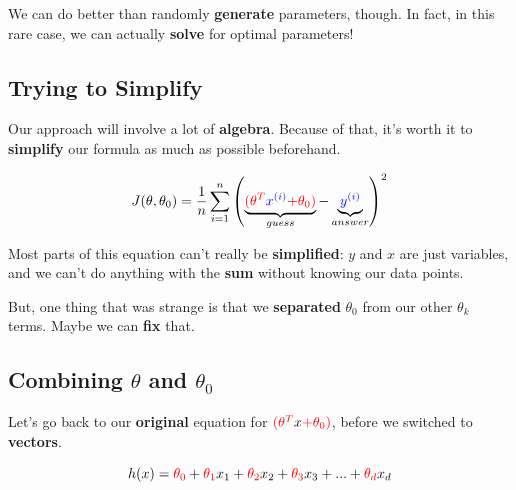     We can do better than randomly \textbf{generate} parameters, though. In fact, in this rare case, we can actually \textbf{solve} for optimal parameters!
    
    \subsection{Trying to Simplify}
        
        Our approach will involve a lot of \textbf{algebra}. Because of that, it's worth it to \textbf{simplify} our formula as much as possible beforehand.
        
        \begin{equation}
            J(\theta,\theta_0) = 
                        \frac{1}{n}  \sum_{i=1}^n 
                        \left( 
                            \underbrace{
                                \textcolor{red}{ (\theta^T} \textcolor{blue}{x^{(i)}} \textcolor{red}{ + \theta_0) } 
                            }_{guess}
                            - \underbrace{
                                \textcolor{blue}{y^{(i)}}
                            }_{answer}
                        \right)^2 
        \end{equation}
        
        Most parts of this equation can't really be \textbf{simplified}: $y$ and $x$ are just variables, and we can't do anything with the \textbf{sum} without knowing our data points.
        
        But, one thing that was strange is that we \textbf{separated} $\theta_0$ from our other $\theta_k$ terms. Maybe we can \textbf{fix} that.
        
    \subsection{Combining $\theta$ and $\theta_0$}
        
         Let's go back to our \textbf{original} equation for $\textcolor{red}{ (\theta^T} x \textcolor{red}{ + \theta_0) } $, before we switched to \textbf{vectors}.
        
        \begin{equation}
            h(x) = \textcolor{red}{\theta_0} + \textcolor{red}{\theta_1}x_1 + \textcolor{red}{\theta_2}x_2 + \textcolor{red}{\theta_3}x_3 + ... + \textcolor{red}{\theta_d}x_d
        \end{equation}
        
